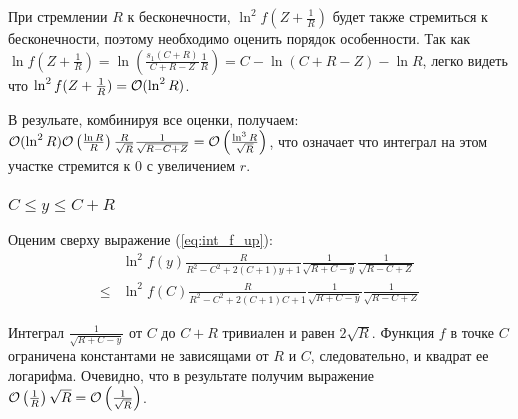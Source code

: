 При стремлении $R$ к бесконечности, $\ln^2 f(Z + \frac{1}{R})$ будет также стремиться к бесконечности, поэтому необходимо оценить порядок особенности. Так как $\ln f(Z + \frac{1}{R}) = \ln \left( \frac{s_1(C + R)}{C + R - Z} \frac{1}{R} \right) = C - \ln (C + R - Z) - \ln R$, легко видеть что $\ln^2 f(Z + \frac{1}{R}) = \mathcal{O} (\ln^2 R)$.

В резульате, комбинируя все оценки, получаем: $\mathcal{O} (\ln^2 R) \mathcal{O}\left( \frac{\ln R}{R} \right) \frac{R}{\sqrt{R}} \frac{1}{\sqrt{R - C + Z}} = \mathcal{O}\left( \frac{\ln^3 R}{\sqrt{R}} \right)$, что означает что интеграл на этом участке стремится к $0$ с увеличением $r$.

\subsubsection{$C \le y \le C + R$}

Оценим сверху выражение (\ref{eq:int_f_up}):
\begin{align*}
       & \ln^2 f(y) \frac{R}{R^2 - C^2 + 2 (C + 1) y + 1} \frac{1}{\sqrt{R + C - y}} \frac{1}{\sqrt{R - C + Z}}
\\ \le & \ln^2 f(C) \frac{R}{R^2 - C^2 + 2 (C + 1) C + 1} \frac{1}{\sqrt{R + C - y}} \frac{1}{\sqrt{R - C + Z}}
\end{align*}

Интеграл $\frac{1}{\sqrt{R + C - y}}$ от $C$ до $C + R$ тривиален и равен $2 \sqrt{R}$. Функция $f$ в точке $C$ ограничена константами не зависящами от $R$ и $C$, следовательно, и квадрат ее логарифма. Очевидно, что в результате получим выражение $\mathcal{O} \left( \frac{1}{R} \right) \sqrt R = \mathcal{O} \left( \frac{1}{\sqrt{R}} \right)$.